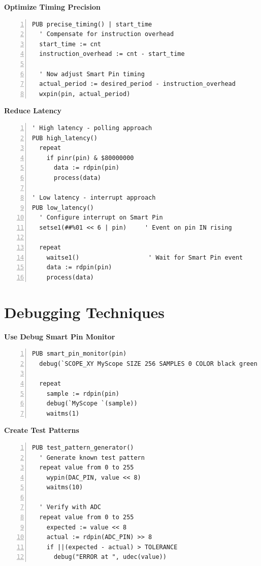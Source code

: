 \documentclass[11pt,a4paper,oneside,english]{book}
\begin{document}
\textbf{Optimize Timing Precision}

\begin{Spin2Block}
\begin{Verbatim}[numbers=left,numbersep=5pt,xleftmargin=15pt]
PUB precise_timing() | start_time
  ' Compensate for instruction overhead
  start_time := cnt
  instruction_overhead := cnt - start_time
  
  ' Now adjust Smart Pin timing
  actual_period := desired_period - instruction_overhead
  wxpin(pin, actual_period)
\end{Verbatim}
\end{Spin2Block}

\textbf{Reduce Latency}

\begin{Spin2Block}
\begin{Verbatim}[numbers=left,numbersep=5pt,xleftmargin=15pt]
' High latency - polling approach
PUB high_latency()
  repeat
    if pinr(pin) & $80000000
      data := rdpin(pin)
      process(data)
      
' Low latency - interrupt approach
PUB low_latency()
  ' Configure interrupt on Smart Pin
  setse1(##%01 << 6 | pin)     ' Event on pin IN rising
  
  repeat
    waitse1()                   ' Wait for Smart Pin event
    data := rdpin(pin)
    process(data)
\end{Verbatim}
\end{Spin2Block}

\hypertarget{debugging-techniques}{%
\section{Debugging Techniques}\label{debugging-techniques}}

\textbf{Use Debug Smart Pin Monitor}

\begin{Spin2Block}
\begin{Verbatim}[numbers=left,numbersep=5pt,xleftmargin=15pt]
PUB smart_pin_monitor(pin)
  debug(`SCOPE_XY MyScope SIZE 256 SAMPLES 0 COLOR black green TRIGGER 128)
  
  repeat
    sample := rdpin(pin)
    debug(`MyScope `(sample))
    waitms(1)
\end{Verbatim}
\end{Spin2Block}

\textbf{Create Test Patterns}

\begin{Spin2Block}
\begin{Verbatim}[numbers=left,numbersep=5pt,xleftmargin=15pt]
PUB test_pattern_generator()
  ' Generate known test pattern
  repeat value from 0 to 255
    wypin(DAC_PIN, value << 8)
    waitms(10)
    
  ' Verify with ADC
  repeat value from 0 to 255
    expected := value << 8
    actual := rdpin(ADC_PIN) >> 8
    if ||(expected - actual) > TOLERANCE
      debug("ERROR at ", udec(value))
\end{Verbatim}
\end{Spin2Block}
\end{document}
